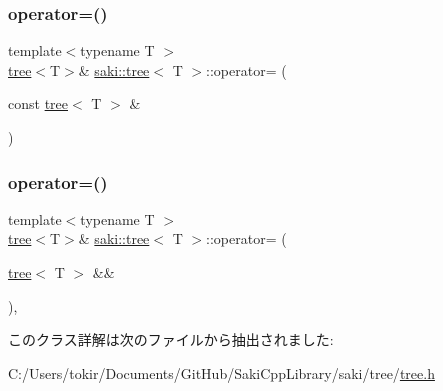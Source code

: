 \subsubsection{\texorpdfstring{operator=()}{operator=()}\hspace{0.1cm}{\footnotesize\ttfamily [1/2]}}
{\footnotesize\ttfamily template$<$typename T $>$ \\
\mbox{\hyperlink{classsaki_1_1tree}{tree}}$<$T$>$\& \mbox{\hyperlink{classsaki_1_1tree}{saki\+::tree}}$<$ T $>$\+::operator= (\begin{DoxyParamCaption}\item[{const \mbox{\hyperlink{classsaki_1_1tree}{tree}}$<$ T $>$ \&}]{ }\end{DoxyParamCaption})\hspace{0.3cm}{\ttfamily [default]}}

\mbox{\label{classsaki_1_1tree_ac5212002d014e676b9c43f4dbbef595f}} 
\subsubsection{\texorpdfstring{operator=()}{operator=()}\hspace{0.1cm}{\footnotesize\ttfamily [2/2]}}
{\footnotesize\ttfamily template$<$typename T $>$ \\
\mbox{\hyperlink{classsaki_1_1tree}{tree}}$<$T$>$\& \mbox{\hyperlink{classsaki_1_1tree}{saki\+::tree}}$<$ T $>$\+::operator= (\begin{DoxyParamCaption}\item[{\mbox{\hyperlink{classsaki_1_1tree}{tree}}$<$ T $>$ \&\&}]{ }\end{DoxyParamCaption})\hspace{0.3cm}{\ttfamily [default]}, {\ttfamily [noexcept]}}



このクラス詳解は次のファイルから抽出されました\+:\begin{DoxyCompactItemize}
\item 
C\+:/\+Users/tokir/\+Documents/\+Git\+Hub/\+Saki\+Cpp\+Library/saki/tree/\mbox{\hyperlink{tree_2tree_8h}{tree.\+h}}\end{DoxyCompactItemize}
